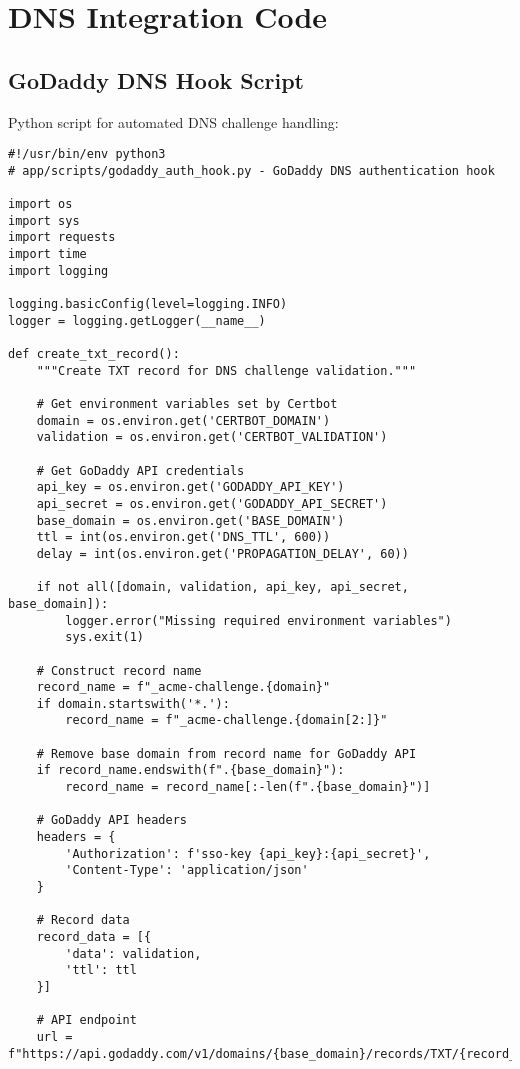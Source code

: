 \section{DNS Integration Code}

\subsection{GoDaddy DNS Hook Script}

Python script for automated DNS challenge handling:

\begin{verbatim}
#!/usr/bin/env python3
# app/scripts/godaddy_auth_hook.py - GoDaddy DNS authentication hook

import os
import sys
import requests
import time
import logging

logging.basicConfig(level=logging.INFO)
logger = logging.getLogger(__name__)

def create_txt_record():
    """Create TXT record for DNS challenge validation."""
    
    # Get environment variables set by Certbot
    domain = os.environ.get('CERTBOT_DOMAIN')
    validation = os.environ.get('CERTBOT_VALIDATION')
    
    # Get GoDaddy API credentials
    api_key = os.environ.get('GODADDY_API_KEY')
    api_secret = os.environ.get('GODADDY_API_SECRET')
    base_domain = os.environ.get('BASE_DOMAIN')
    ttl = int(os.environ.get('DNS_TTL', 600))
    delay = int(os.environ.get('PROPAGATION_DELAY', 60))
    
    if not all([domain, validation, api_key, api_secret, base_domain]):
        logger.error("Missing required environment variables")
        sys.exit(1)
    
    # Construct record name
    record_name = f"_acme-challenge.{domain}"
    if domain.startswith('*.'):
        record_name = f"_acme-challenge.{domain[2:]}"
    
    # Remove base domain from record name for GoDaddy API
    if record_name.endswith(f".{base_domain}"):
        record_name = record_name[:-len(f".{base_domain}")]
    
    # GoDaddy API headers
    headers = {
        'Authorization': f'sso-key {api_key}:{api_secret}',
        'Content-Type': 'application/json'
    }
    
    # Record data
    record_data = [{
        'data': validation,
        'ttl': ttl
    }]
    
    # API endpoint
    url = f"https://api.godaddy.com/v1/domains/{base_domain}/records/TXT/{record_name}"
    

\end{verbatim}
